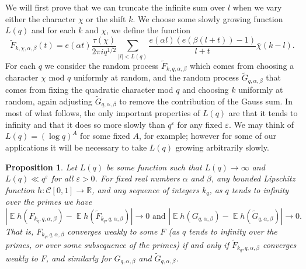 \documentclass[12pt, a4paper]{amsart}
\newtheorem{proposition}{Proposition}
\theoremstyle{remark}
\newcommand{\R}{\ensuremath{\mathbb{R}}}
\newcommand{\abs}[1]{\left|#1\right|}
\newcommand{\chibar}{\overline \chi}
\DeclareMathOperator{\E}{\mathbb{E}}
\begin{document}
We will first prove that we can truncate the infinite sum over $l$ when
we vary either the character $\chi$ or the shift $k$. We choose some slowly growing function $L(q)$
and for each $k$ and $\chi$, we define the function
\[
    \tilde F_{k,\chi,\alpha,\beta}(t)
    = e(\alpha t)\frac{\tau(\chi)}{2\pi i q^{1/2}}\sum_{\abs{l} < L(q)}
    \frac{e(\alpha l) (e(\beta(l + t)) - 1)}
    {l + t}
    \chibar(k-l).
\]
For each $q$ we consider the random process $\tilde F_{k,q,\alpha,\beta}$
which comes from choosing a character $\chi$ mod $q$ uniformly at random,
and the random process $\tilde G_{q, \alpha, \beta}$ that comes from
fixing the quadratic character mod $q$ and choosing $k$ uniformly at random,
again adjusting $\tilde G_{q,\alpha,\beta}$ to remove the contribution of the
Gauss sum.
In most of what follows, the only important properties of $L(q)$ are
that it tends to infinity and that it does so more slowly than $q^{\varepsilon}$ for
any fixed $\varepsilon$. We may think of $L(q) = (\log q)^A$ for some fixed $A$,
for example; however for some of our applications it will be necessary to take
$L(q)$ growing arbitrarily slowly.
\begin{proposition}\label{proposition:truncation}
    Let $L(q)$ be some function such that $L(q) \rightarrow \infty$ and
    $L(q) \ll q^\varepsilon$ for all $\varepsilon > 0$.
    For fixed real numbers $\alpha$ and $\beta$, any bounded Lipschitz function $h:\mathscr{C}[0,1] \rightarrow \R$, and
    any sequence of integers $k_q$, as $q$ tends to infinity over the primes we have 
    \[
        \abs{\E h(F_{k_q,q,\alpha,\beta}) - \E h(\tilde F_{k_q,q,\alpha,\beta})} \rightarrow 0 \text{ and } \abs{\E h(G_{q,\alpha,\beta}) - \E h(\tilde G_{q,\alpha,\beta})} \rightarrow 0.
    \]
    That is, $F_{k_q,q,\alpha,\beta}$ converges weakly to some $F$ (as $q$ tends
    to infinity over the primes, or over some subsequence of the primes) if and
    only if $\tilde F_{k_q,q,\alpha,\beta}$ converges weakly to $F$, and similarly for $G_{q, \alpha, \beta}$ and $\tilde G_{q, \alpha, \beta}$. 

\end{proposition}
\end{document}
